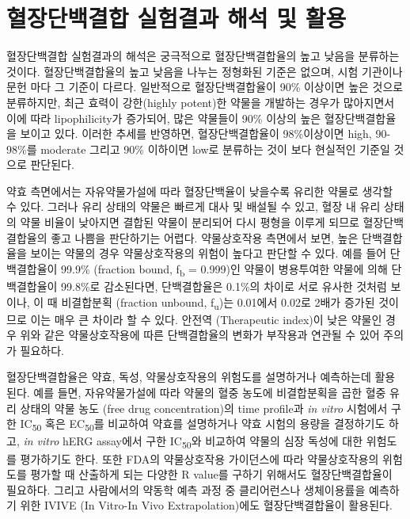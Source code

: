 \documentclass[
  11pt,
  krantz2, a4paper, twoside]{krantz}
\begin{document}
\hypertarget{uxd608uxc7a5uxb2e8uxbc31uxacb0uxd569-uxc2e4uxd5d8uxacb0uxacfc-uxd574uxc11d-uxbc0f-uxd65cuxc6a9}{%
\section{혈장단백결합 실험결과 해석 및 활용}\label{uxd608uxc7a5uxb2e8uxbc31uxacb0uxd569-uxc2e4uxd5d8uxacb0uxacfc-uxd574uxc11d-uxbc0f-uxd65cuxc6a9}}

혈장단백결합 실험결과의 해석은 궁극적으로 혈장단백결합율의 높고 낮음을
분류하는 것이다. 혈장단백결합율의 높고 낮음을 나누는 정형화된 기준은
없으며, 시험 기관이나 문헌 마다 그 기준이 다르다. 일반적으로
혈장단백결합율이 90\% 이상이면 높은 것으로 분류하지만, 최근 효력이 강한(highly potent)한 약물을 개발하는 경우가 많아지면서 이에 따라 lipophilicity가
증가되어, 많은 약물들이 90\% 이상의 높은 혈장단백결합율을 보이고 있다.
이러한 추세를 반영하면, 혈장단백결합율이 98\%이상이면 high, 90-98\%를
moderate 그리고 90\% 이하이면 low로 분류하는 것이 보다 현실적인 기준일
것으로 판단된다.

약효 측면에서는 자유약물가설에 따라 혈장단백율이 낮을수록 유리한 약물로
생각할 수 있다. 그러나 유리 상태의 약물은 빠르게 대사 및 배설될 수 있고,
혈장 내 유리 상태의 약물 비율이 낮아지면 결합된 약물이 분리되어 다시
평형을 이루게 되므로 혈장단백결합율의 좋고 나쁨을 판단하기는 어렵다.
약물상호작용 측면에서 보면, 높은 단백결합율을 보이는 약물의 경우
약물상호작용의 위험이 높다고 판단할 수 있다. 예를 들어 단백결합율이
99.9\% (fraction bound, f\textsubscript{b} = 0.999)인 약물이 병용투여한 약물에 의해
단백결합율이 99.8\%로 감소된다면, 단백결합율은 0.1\%의 차이로 서로 유사한
것처럼 보이나, 이 때 비결합분획 (fraction unbound, f\textsubscript{u})는 0.01에서
0.02로 2배가 증가된 것이므로 이는 매우 큰 차이라 할 수 있다. 안전역
(Therapeutic index)이 낮은 약물인 경우 위와 같은 약물상호작용에 따른
단백결합율의 변화가 부작용과 연관될 수 있어 주의가 필요하다.

혈장단백결합율은 약효, 독성, 약물상호작용의 위험도를 설명하거나
예측하는데 활용된다. 예를 들면, 자유약물가설에 따라 약물의 혈중 농도에
비결합분획을 곱한 혈중 유리 상태의 약물 농도 (free drug concentration)의
time profile과 \emph{in vitro} 시험에서 구한 IC\textsubscript{50} 혹은 EC\textsubscript{50}를 비교하여
약효를 설명하거나 약효 시험의 용량을 결정하기도 하고, \emph{in vitro} hERG
assay에서 구한 IC\textsubscript{50}와 비교하여 약물의 심장 독성에 대한 위험도를
평가하기도 한다. 또한 FDA의 약물상호작용 가이던스에 따라 약물상호작용의
위험도를 평가할 때 산출하게 되는 다양한 R value를 구하기 위해서도
혈장단백결합율이 필요하다. 그리고 사람에서의 약동학 예측 과정 중
클리어런스나 생체이용률을 예측하기 위한 IVIVE (In Vitro-In Vivo
Extrapolation)에도 혈장단백결합율이 활용된다.
\end{document}

